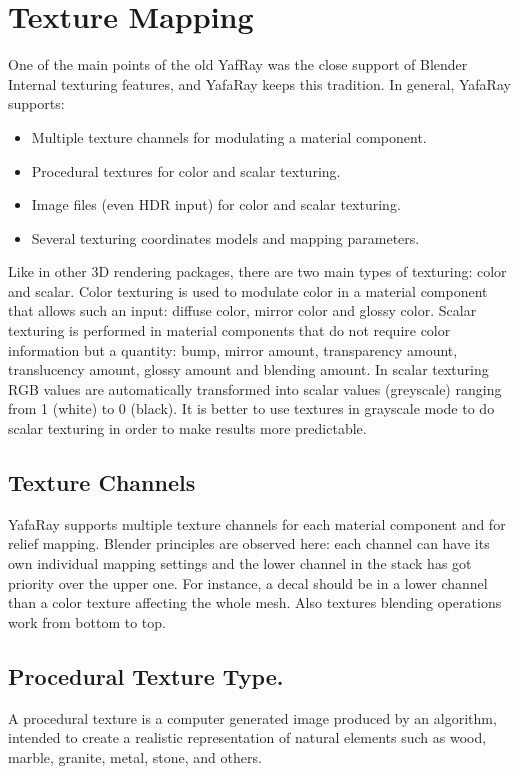 \chapter{Texture Mapping}

One of the main points of the old YafRay was the close support of Blender Internal texturing features, and YafaRay keeps this tradition. In general, YafaRay supports:
\begin{itemize}
\item Multiple texture channels for modulating a material component.
\item Procedural textures for color and scalar texturing.
\item Image files (even HDR input) for color and scalar texturing.
\item Several texturing coordinates models and mapping parameters.
\end{itemize}

Like in other 3D rendering packages, there are two main types of texturing: color and scalar. Color texturing is used to modulate color in a material component that allows such an input: diffuse color, mirror color and glossy color. Scalar texturing is performed in material components that do not require color information but a quantity: bump, mirror amount, transparency amount, translucency amount, glossy amount and blending amount. In scalar texturing RGB values are automatically transformed into scalar values (greyscale) ranging from 1 (white) to 0 (black). It is better to use textures in grayscale mode to do scalar texturing in order to make results more predictable.
\section{Texture Channels}

YafaRay supports multiple texture channels for each material component and for relief mapping. Blender principles are observed here: each channel can have its own individual mapping settings and the lower channel in the stack has got priority over the upper one. For instance, a decal should be in a lower channel than a color texture affecting the whole mesh. Also textures blending operations work from bottom to top.
\section{Procedural Texture Type.}

A procedural texture is a computer generated image produced by an algorithm, intended to create a realistic representation of natural elements such as wood, marble, granite, metal, stone, and others.

